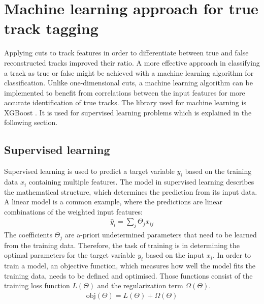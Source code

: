 \chapter{Machine learning approach for true track tagging}
Applying cuts to track features in order to differentiate between true and false reconstructed tracks improved their ratio. A more effective
approach in classifying a track as true or false might be achieved with a machine learning algorithm for classification. Unlike one-dimensional cuts, a machine learning
algorithm can be implemented to benefit from correlations between the input features for more accurate identification of true tracks. The library used for
machine learning is XGBoost \cite{xgboost}. It is used for supervised learning problems \cite{supervised} which is explained in the following section.

\section{Supervised learning}
Supervised learning is used to predict a target variable $y_i$ based on the training data $x_i$ containing multiple features. The model
in supervised learning describes the mathematical structure, which determines the prediction from its input data. A linear model is a common example, where the predictions
are linear combinations of the weighted input features:
\begin{align}
  \hat{y}_i = \sum_j \Theta_j x_{ij}
\end{align}
The coefficients $\Theta_j$ are a-priori undetermined parameters that need to be learned from the training data.
Therefore, the task of training is in determining the optimal parameters
for the target variable $y_i$ based on the input $x_i$. In order to train a model, an objective function, which measures how well
the model fits the training data, needs to be defined and optimised.
Those functions consist of the training loss function $L(\Theta) $ and the regularization term $\Omega (\Theta)$.
\begin{align}
  \text{obj}(\Theta) = L(\Theta) + \Omega(\Theta)
\end{align}

